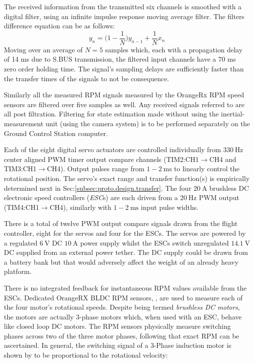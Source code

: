 \par
{\color{red}
The received information from the transmitted six channels is smoothed with a digital filter, using an infinite impulse response moving average filter. The filters difference equation can be as follows: 
\begin{equation}
y_n = \big(1-\frac{1}{N}\big)y_{n-1}+\frac{1}{N}x_n
\end{equation}
Moving over an average of $N=5$ samples which, each with a propagation delay of 14 ms due to S.BUS transmission, the filtered input channels have a 70 ms zero order holding time. The signal's sampling delays are sufficiently faster than the transfer times of the signals to not be consequence.
\par
Similarly all the measured RPM signals measured by the OrangeRx RPM speed sensors are filtered over five samples as well. Any received signals referred to are all post filtration. Filtering for state estimation made without using the inertial-measurement unit (using the camera system) is to be performed separately on the Ground Control Station computer.}
\par
Each of the eight digital servo actuators are controlled individually from $330~\text{Hz}$ center aligned PWM timer output compare channels (TIM2:CH1$\rightarrow$CH4 and TIM3:CH1$\rightarrow$CH4). Output pulses range from $1-2~\text{ms}$ to linearly control the rotational position. The servo's exact range and transfer function(s) is empirically determined next in Sec:\ref{subsec:proto.design.transfer}. The four $20~\text{A}$ brushless DC electronic speed controllers (\emph{ESC}s) are each driven from a $20~\text{Hz}$ PWM output (TIM4:CH1$\rightarrow$CH4), similarly with $1-2~\text{ms}$ input pulse widths. 
\par
There is a total of twelve PWM output compare signals drawn from the flight controller, eight for the servos and four for the ESCs. The servos are powered by a regulated $6~\text{V}$ DC $10~\text{A}$ power supply \cite{rotorstar} whilst the ESCs switch unregulated $14.1~\text{V}$ DC supplied from an external power tether. The DC supply could be drawn from a battery bank but that would adversely affect the weight of an already heavy platform.
\par
There is no integrated feedback for instantaneous RPM values available from the ESCs. Dedicated OrangeRX BLDC RPM sensors, \cite{orangerpm}, are used to measure each of the four motor's rotational speeds. Despite being termed \emph{brushless DC motors}, the motors are actually 3-phase motors which, when used with an ESC, behave like closed loop DC motors. The RPM sensors physically measure switching phases across two of the three motor phases, following that exact RPM can be ascertained. In general, the switching signal of a 3-Phase induction motor is shown by \cite{vfd} to be proportional to the rotational velocity:
